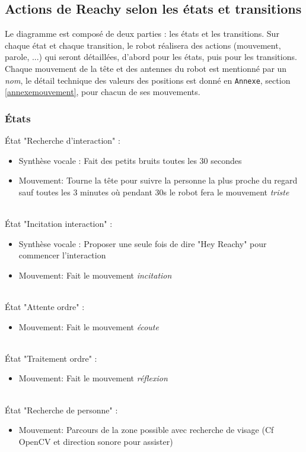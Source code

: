 \subsection{Actions de Reachy selon les états et transitions}
Le diagramme est composé de deux parties : les états et les transitions. Sur chaque état et chaque transition, le robot réalisera des actions (mouvement, parole, ...) qui seront détaillées, d'abord pour les états, puis pour les transitions. \\

Chaque mouvement de la tête et des antennes du robot est mentionné par un \textit{nom}, le détail technique des valeurs des positions est donné en \texttt{Annexe}, section \ref{annexemouvement}, pour chacun de ses mouvements.

\subsubsection{États}
\noindent État "Recherche d'interaction" :
\begin{itemize}
    \item Synthèse vocale : Fait des petits bruits toutes les 30 secondes
    \item Mouvement: Tourne la tête pour suivre la personne la plus proche du regard sauf toutes les 3 minutes où pendant 30s le robot fera le mouvement \textit{triste}
\end{itemize} 
\ \\
État "Incitation interaction" :
\begin{itemize}
    \item Synthèse vocale : Proposer une seule fois de dire "Hey Reachy" pour commencer l'interaction
    \item Mouvement: Fait le mouvement \textit{incitation}
\end{itemize}
\ \\
État "Attente ordre" :
\begin{itemize}
    \item Mouvement: Fait le mouvement \textit{écoute}
\end{itemize}
\ \\
État "Traitement ordre" :
\begin{itemize}
    \item Mouvement: Fait le mouvement \textit{réflexion}
\end{itemize}
\ \\
État "Recherche de personne" : 
\begin{itemize}
    \item  Mouvement: Parcours de la zone possible avec recherche de visage (Cf OpenCV et direction sonore pour assister)
\end{itemize}
